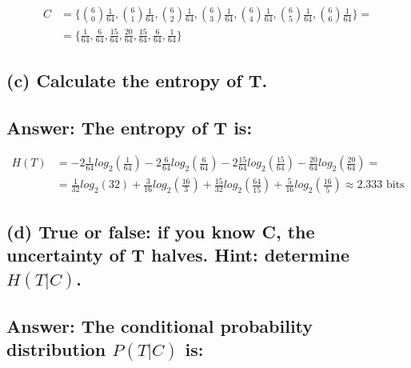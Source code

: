 \documentclass[11px]{article}
\begin{document}
\begin{equation}
\begin{split}
C & = \{\binom{6}{0}\frac{1}{64}, \binom{6}{1}\frac{1}{64}, \binom{6}{2}\frac{1}{64}, \binom{6}{3}\frac{1}{64}, \binom{6}{4}\frac{1}{64}, \binom{6}{5}\frac{1}{64}, \binom{6}{6}\frac{1}{64}\} = \\ 
& = \{\frac{1}{64}, \frac{6}{64}, \frac{15}{64}, \frac{20}{64}, \frac{15}{64}, \frac{6}{64}, \frac{1}{64}\}
\end{split}
\end{equation}

\subsection*{\normalfont (c) Calculate the entropy of T.}

\subsection*{Answer: The entropy of T is:}

\begin{equation}
\begin{split}
H(T) & = -2\frac{1}{64}log_2(\frac{1}{64}) - 2\frac{6}{64}log_2(\frac{6}{64}) - 2\frac{15}{64}log_2(\frac{15}{64}) - \frac{20}{64}log_2(\frac{20}{64}) = \\
& = \frac{1}{32}log_2(32) + \frac{3}{16}log_2(\frac{16}{3}) + \frac{15}{32}log_2(\frac{64}{15}) + \frac{5}{16}log_2(\frac{16}{5}) \approx 2.333 \text{ bits}
\end{split}
\end{equation}

\subsection*{\normalfont(d) True or false: if you know C, the uncertainty of T halves. Hint: determine \(H(T|C)\).} 

\subsection*{Answer: The conditional probability distribution \(P(T|C)\) is:}
\end{document}
